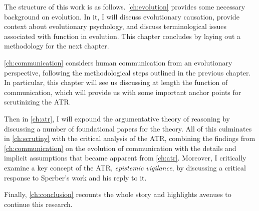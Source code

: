 
The structure of this work is as follows.
\cref{ch:evolution} provides some necessary background on evolution. In it, I will discuss evolutionary causation, provide context about evolutionary psychology, and discuss terminological issues associated with function in evolution. This chapter concludes by laying out a methodology for the next chapter.

\cref{ch:communication} considers human communication from an evolutionary perspective, following the methodological steps outlined in the previous chapter. In particular, this chapter will see us discussing at length the function of communication, which will provide us with some important anchor points for scrutinizing the ATR.

Then in \cref{ch:atr}, I will expound the argumentative theory of reasoning by discussing a number of foundational papers for the theory.
All of this culminates in \cref{ch:scrutiny} with the critical analysis of the ATR, combining the findings from \cref{ch:communication} on the evolution of communication with the details and implicit assumptions that became apparent from \cref{ch:atr}. Moreover, I critically examine a key concept of the ATR, \emph{epistemic vigilance}, by discussing a critical response to Sperber's work and his reply to it.

Finally, \cref{ch:conclusion} recounts the whole story and highlights avenues to continue this research.

